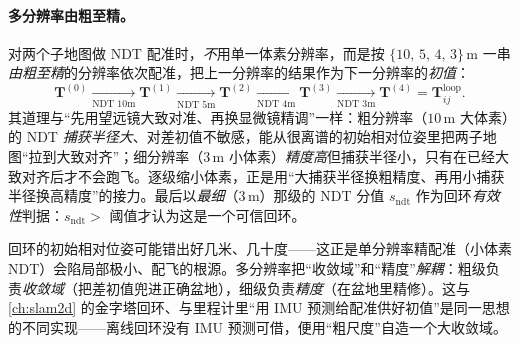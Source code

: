 \paragraph{多分辨率由粗至精。}
对两个子地图做 NDT 配准时，\emph{不}用单一体素分辨率，而是按 $\{10,\,5,\,4,\,3\}$\,m 一串\emph{由粗至精}的分辨率依次配准，把上一分辨率的结果作为下一分辨率的\emph{初值}\cite{gao2023slamad}：
\begin{equation}
\label{eq:lidar-map-multires}
\mathbf{T}^{(0)}\xrightarrow[\text{NDT }10\text{m}]{}\mathbf{T}^{(1)}
\xrightarrow[\text{NDT }5\text{m}]{}\mathbf{T}^{(2)}
\xrightarrow[\text{NDT }4\text{m}]{}\mathbf{T}^{(3)}
\xrightarrow[\text{NDT }3\text{m}]{}\mathbf{T}^{(4)}=\mathbf{T}_{ij}^{\text{loop}}.
\end{equation}
其道理与“先用望远镜大致对准、再换显微镜精调”一样：粗分辨率（$10$\,m 大体素）的 NDT \emph{捕获半径大}、对差初值不敏感，能从很离谱的初始相对位姿里把两子地图“拉到大致对齐”；细分辨率（$3$\,m 小体素）\emph{精度高}但捕获半径小，只有在已经大致对齐后才不会跑飞。逐级缩小体素，正是用“大捕获半径换粗精度、再用小捕获半径换高精度”的接力。最后以\emph{最细}（$3$\,m）那级的 NDT 分值 $s_{\text{ndt}}$ 作为回环\emph{有效性}判据：$s_{\text{ndt}}>$ 阈值才认为这是一个可信回环。

\begin{insight}[多分辨率 = 用粗尺度的大收敛域兜住差初值]
回环的初始相对位姿可能错出好几米、几十度——这正是单分辨率精配准（小体素 NDT）会陷局部极小、配飞的根源。多分辨率把“收敛域”和“精度”\emph{解耦}：粗级负责\emph{收敛域}（把差初值兜进正确盆地），细级负责\emph{精度}（在盆地里精修）。这与 \cref{ch:slam2d} 的金字塔回环、与里程计里“用 IMU 预测给配准供好初值”是同一思想的不同实现——离线回环没有 IMU 预测可借，便用“粗尺度”自造一个大收敛域。
\end{insight}

